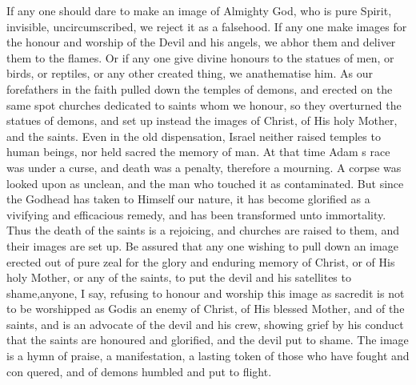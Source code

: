 \documentclass[10pt]{book}
\begin{document}
\begin{paracol}{2}
If any one should 
dare to make an image of Almighty God, who 
is pure Spirit, invisible, uncircumscribed, we 
reject it as a falsehood. If any one make 
images for the honour and worship of the 
Devil and his angels, we abhor them and 
deliver them to the flames. Or if any one give 
divine honours to the statues of men, or birds, 
or reptiles, or any other created thing, we 
anathematise him. As our forefathers in the 
faith pulled down the temples of demons, and 
erected on the same spot churches dedicated 
to saints whom we honour, so they overturned 
the statues of demons, and set up instead the 
images of Christ, of His holy Mother, and the 
saints. Even in the old dispensation, Israel 
neither raised temples to human beings, nor 
held sacred the memory of man. At that time 
Adam s race was under a curse, and death was 
a penalty, therefore a mourning. A corpse 
was looked upon as unclean, and the man who 
touched it as contaminated. But since the 
Godhead has taken to Himself our nature, it 
has become glorified as a vivifying and efficacious
remedy, and has been transformed unto 
immortality. Thus the death of the saints is a 
rejoicing, and churches are raised to them, and 
their images are set up. Be assured that any 
one wishing to pull down an image erected out 
of pure zeal for the glory and enduring memory 
of Christ, or of His holy Mother, or any of the 
saints, to put the devil and his satellites to 
shame,\textemdash anyone, I say, refusing to honour and 
worship this image as sacred\textemdash it is not to be 
worshipped as God\textemdash is an enemy of Christ, of 
His blessed Mother, and of the saints, and is an 
advocate of the devil and his crew, showing 
grief by his conduct that the saints are honoured 
and glorified, and the devil put to shame. The 
image is a hymn of praise, a manifestation, a 
lasting token of those who have fought and con 
quered, and of demons humbled and put to flight. 

\end{paracol}
\end{document}

